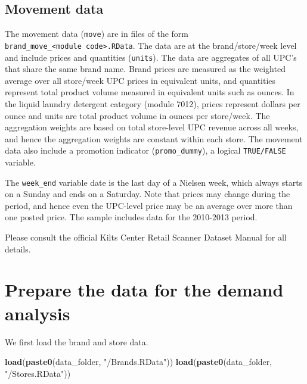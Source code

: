 \documentclass[
]{article}
\newenvironment{Shaded}{\begin{snugshade}}{\end{snugshade}}
\newcommand{\FunctionTok}[1]{\textcolor[rgb]{0.13,0.29,0.53}{\textbf{#1}}}
\newcommand{\NormalTok}[1]{#1}
\newcommand{\StringTok}[1]{\textcolor[rgb]{0.31,0.60,0.02}{#1}}
\begin{document}
\subsection{Movement data}\label{movement-data}

The movement data (\texttt{move}) are in files of the form
\texttt{brand\_move\_\textless{}module\ code\textgreater{}.RData}. The
data are at the brand/store/week level and include prices and quantities
(\texttt{units}). The data are aggregates of all UPC's that share the
same brand name. Brand prices are measured as the weighted average over
all store/week UPC prices in equivalent units, and quantities represent
total product volume measured in equivalent units such as ounces. In the
liquid laundry detergent category (module 7012), prices represent
dollars per ounce and units are total product volume in ounces per
store/week. The aggregation weights are based on total store-level UPC
revenue across all weeks, and hence the aggregation weights are constant
within each store. The movement data also include a promotion indicator
(\texttt{promo\_dummy}), a logical \texttt{TRUE/FALSE} variable.

The \texttt{week\_end} variable date is the last day of a Nielsen week,
which always starts on a Sunday and ends on a Saturday. Note that prices
may change during the period, and hence even the UPC-level price may be
an average over more than one posted price. The sample includes data for
the 2010-2013 period.

Please consult the official Kilts Center Retail Scanner Dataset Manual
for all details.

\newpage

\section{Prepare the data for the demand
analysis}\label{prepare-the-data-for-the-demand-analysis}

We first load the brand and store data.

\begin{Shaded}
\begin{Highlighting}[]
\FunctionTok{load}\NormalTok{(}\FunctionTok{paste0}\NormalTok{(data\_folder, }\StringTok{"/Brands.RData"}\NormalTok{))}
\FunctionTok{load}\NormalTok{(}\FunctionTok{paste0}\NormalTok{(data\_folder, }\StringTok{"/Stores.RData"}\NormalTok{))}
\end{Highlighting}
\end{Shaded}
\end{document}
